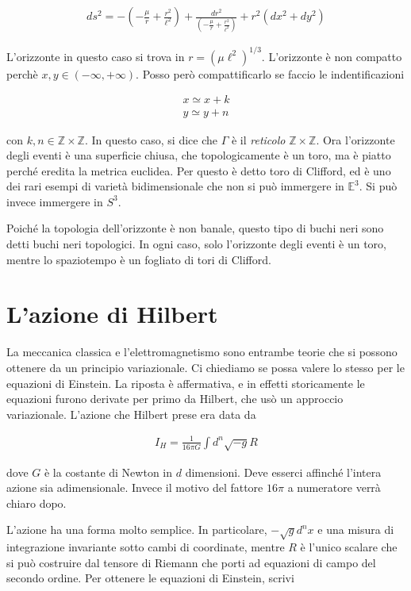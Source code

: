 \documentclass{report}
\begin{document}
\begin{align}
    ds^2 = -\left(-\frac{\mu}{r} + \frac{r^2}{\ell^2}\right) + \frac{dr^2}{\left(-\frac{\mu}{r} + \frac{r^2}{\ell^2}\right)} + r^2(dx^2+dy^2)
\end{align}

L'orizzonte in questo caso si trova in \(r = (\mu\ell^2)^{1/3}\). L'orizzonte è non compatto perchè \(x, y \in (-\infty, +\infty)\). Posso però compattificarlo se faccio le indentificazioni 

\begin{align}
    x \simeq x + k \\ 
    y \simeq y + n 
\end{align}

con \(k, n \in \mathbb{Z} \times \mathbb{Z}\). In questo caso, si dice che \(\Gamma\) è il \emph{reticolo} \(\mathbb{Z} \times \mathbb{Z}\). Ora l'orizzonte degli eventi è una superficie chiusa, che topologicamente è un toro, ma è piatto perché eredita la metrica euclidea. Per questo è detto toro di Clifford, ed è uno dei rari esempi di varietà bidimensionale che non si può immergere in \(\mathbb{E}^3\). Si può invece immergere in \(S^3\). 

Poiché la topologia dell'orizzonte è non banale, questo tipo di buchi neri sono detti buchi neri topologici. In ogni caso, solo l'orizzonte degli eventi è un toro, mentre lo spaziotempo è un fogliato di tori di Clifford. 

\section{L'azione di Hilbert}

La meccanica classica e l'elettromagnetismo sono entrambe teorie che si possono ottenere da un principio variazionale. Ci chiediamo se possa valere lo stesso per le equazioni di Einstein. La riposta è affermativa, e in effetti storicamente le equazioni furono derivate per primo da Hilbert, che usò un approccio variazionale. L'azione che Hilbert prese era data da 

\begin{align}
    I_H = \frac{1}{16\pi G}\int d^n \sqrt{-g}R
\end{align}

dove \(G\) è la costante di Newton in \(d\) dimensioni. Deve esserci affinché l'intera azione sia adimensionale. Invece il motivo del fattore \(16\pi\) a numeratore verrà chiaro dopo. 

L'azione ha una forma molto semplice. In particolare, \(-\sqrt{g}d^n x\) e una misura di integrazione invariante sotto cambi di coordinate, mentre \(R\) è l'unico scalare che si può costruire dal tensore di Riemann che porti ad equazioni di campo del secondo ordine. Per ottenere le equazioni di Einstein, scrivi 
\end{document}
